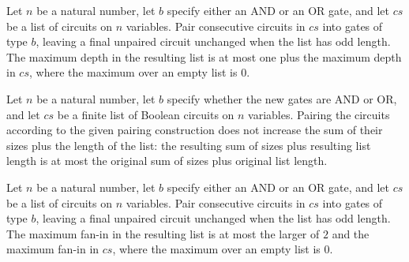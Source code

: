 \begin{theorem}
\label{BoolCircuit.maxDepth_pairUp}
\leanok
{}
Let $n$ be a natural number, let $b$ specify either an AND or an OR gate, and let $cs$
be a list of circuits on $n$ variables. Pair consecutive circuits in $cs$ into gates of
type $b$, leaving a final unpaired circuit unchanged when the list has odd length. The
maximum depth in the resulting list is at most one plus the maximum depth in $cs$, where
the maximum over an empty list is $0$.
\end{theorem}

\begin{theorem}
\label{BoolCircuit.sumSize_pairUp}
\leanok
{}
Let $n$ be a natural number, let $b$ specify whether the new gates are AND or OR, and
let $cs$ be a finite list of Boolean circuits on $n$ variables. Pairing the circuits
according to the given pairing construction does not increase the sum of their sizes
plus the length of the list: the resulting sum of sizes plus resulting list length is at
most the original sum of sizes plus original list length.
\end{theorem}

\begin{theorem}
\label{BoolCircuit.maxFaninL_pairUp}
\leanok
{}
Let $n$ be a natural number, let $b$ specify either an AND or an OR gate, and let $cs$
be a list of circuits on $n$ variables. Pair consecutive circuits in $cs$ into gates of
type $b$, leaving a final unpaired circuit unchanged when the list has odd length. The
maximum fan-in in the resulting list is at most the larger of $2$ and the maximum fan-in
in $cs$, where the maximum over an empty list is $0$.
\end{theorem}


